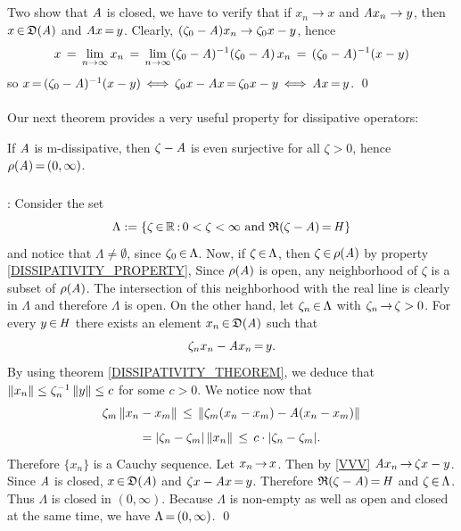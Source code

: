 \documentclass[11pt,twoside]{article}
\begin{document}
\subparagraph{}
Two show that $\mathit{A}$ is closed,
we have to verify that if $x_n \to x$ and $\mathit{A} x_n \to y$,
then $x {\,\in\,} \mathfrak{D}(\mathit{A}) $ and $\mathit{A} x {\,=\,} y$.
Clearly,
$(\zeta_0 - \mathit{A})x_n \to \zeta_0 x-y$, hence
\[
x \,=\, \lim_{n \to \infty} x_n \,=\,
\lim_{n \to \infty} (\zeta_0 - \mathit{A})^{-1}(\zeta_0 - \mathit{A}) \, x_n
\,=\,
(\zeta_0 - \mathit{A})^{-1}(x-y)
\]
so
$x {\,=\,} (\zeta_0 - \mathit{A})^{-1}(x-y)
\, \Longleftrightarrow \, \zeta_0 x - \mathit{A} x {\,=\,} \zeta_0 x - y
\, \Longleftrightarrow \, \mathit{A} x {\,=\,} y$.
\qed

\paragraph{}
Our next theorem provides a very useful property for dissipative operators:

\begin{theorem}
If $\mathit{A}$ is m-dissipative,
then $\zeta - \mathit{A}$ is even surjective for all $\zeta > 0$,
hence $\rho(\mathit{A}) {\,=\,} (0,\infty)$.
\end{theorem}

\subparagraph{}
\Proof:
Consider the set
\[
\Lambda :=
\{ \zeta {\,\in\,} {\mathbb{R}} {\,:\,} 0 < \zeta < \infty \mbox{ and }
\mathfrak{R}(\zeta-\mathit{A}) {\,=\,} \mathit{H} \}
\]
and notice that $\Lambda \neq \emptyset$, since $\zeta_0 {\,\in\,} \Lambda$.
Now,
if $\zeta {\,\in\,} \Lambda$, then $\zeta {\,\in\,} \rho(\mathit{A})$
by property \eqref{DISSIPATIVITY_PROPERTY},
Since $\rho(\mathit{A})$ is open,
any neighborhood of $\zeta$ is a subset of $\rho(\mathit{A})$.
The intersection of this neighborhood with the real line
is clearly in $\Lambda$ and therefore $\Lambda$ is open.
On the other hand,
let $\zeta_n {\,\in\,} \Lambda$ with $\zeta_n {\,\to\,} \zeta > 0$.
For every $y {\,\in\,} \mathit{H}$ there exists an element $x_n {\,\in\,} \mathfrak{D}(\mathit{A})$
such that
\begin{equation}\label{VVV}
\zeta_n x_n - \mathit{A} x_n {\,=\,} y.
\end{equation}
By using theorem \ref{DISSIPATIVITY_THEOREM},
we deduce that
$\left\lVert x_n \right\rVert \leq \zeta_n^{-1} \left\lVert y \right\rVert \leq c$ for some $c > 0$.
We notice now that
\[
\zeta_m \left\lVert x_n - x_m \right\rVert \, \leq \, \left\lVert \zeta_m(x_n - x_m) - \mathit{A}(x_n - x_m) \right\rVert
\]
\[
= \abs{\zeta_n-\zeta_m} \norm{x_n} \, \leq \, c \cdot \abs{\zeta_n-\zeta_m} .
\]
Therefore $\{x_n\}$ is a Cauchy sequence.
Let $x_n {\,\to\,} x$.
Then by \eqref{VVV} $\mathit{A} x_n {\,\to\,} \zeta x - y$.
Since $\mathit{A}$ is closed,
$x {\,\in\,} \mathfrak{D}(\mathit{A})$ and $\zeta x - \mathit{A} x {\,=\,} y$.
Therefore $\mathfrak{R}(\zeta - \mathit{A}) {\,=\,} \mathit{H}$ and $\zeta {\,\in\,} \Lambda$.
Thus $\Lambda$ is closed in $(0,\infty)$.
Because $\Lambda$ is non-empty as well as open and closed at the same time,
we have $\Lambda {\,=\,} (0,\infty)$.
\qed
\end{document}
